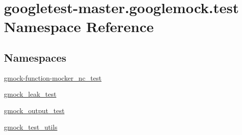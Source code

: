 \hypertarget{namespacegoogletest-master_1_1googlemock_1_1test}{}\section{googletest-\/master.googlemock.\+test Namespace Reference}
\label{namespacegoogletest-master_1_1googlemock_1_1test}
\subsection*{Namespaces}
\begin{DoxyCompactItemize}
\item 
 \mbox{\hyperlink{namespacegoogletest-master_1_1googlemock_1_1test_1_1gmock-function-mocker__nc__test}{gmock-\/function-\/mocker\+\_\+nc\+\_\+test}}
\item 
 \mbox{\hyperlink{namespacegoogletest-master_1_1googlemock_1_1test_1_1gmock__leak__test}{gmock\+\_\+leak\+\_\+test}}
\item 
 \mbox{\hyperlink{namespacegoogletest-master_1_1googlemock_1_1test_1_1gmock__output__test}{gmock\+\_\+output\+\_\+test}}
\item 
 \mbox{\hyperlink{namespacegoogletest-master_1_1googlemock_1_1test_1_1gmock__test__utils}{gmock\+\_\+test\+\_\+utils}}
\end{DoxyCompactItemize}
